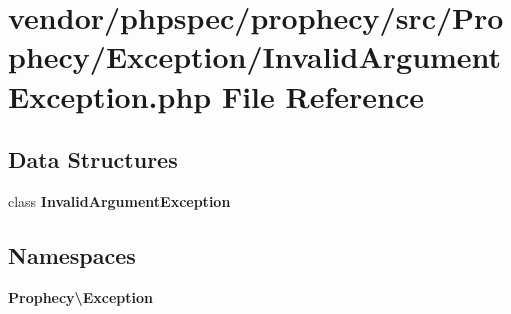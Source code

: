 \section{vendor/phpspec/prophecy/src/\+Prophecy/\+Exception/\+Invalid\+Argument\+Exception.php File Reference}
\label{phpspec_2prophecy_2src_2_prophecy_2_exception_2_invalid_argument_exception_8php}
\subsection*{Data Structures}
\begin{DoxyCompactItemize}
\item 
class {\bf Invalid\+Argument\+Exception}
\end{DoxyCompactItemize}
\subsection*{Namespaces}
\begin{DoxyCompactItemize}
\item 
 {\bf Prophecy\textbackslash{}\+Exception}
\end{DoxyCompactItemize}
